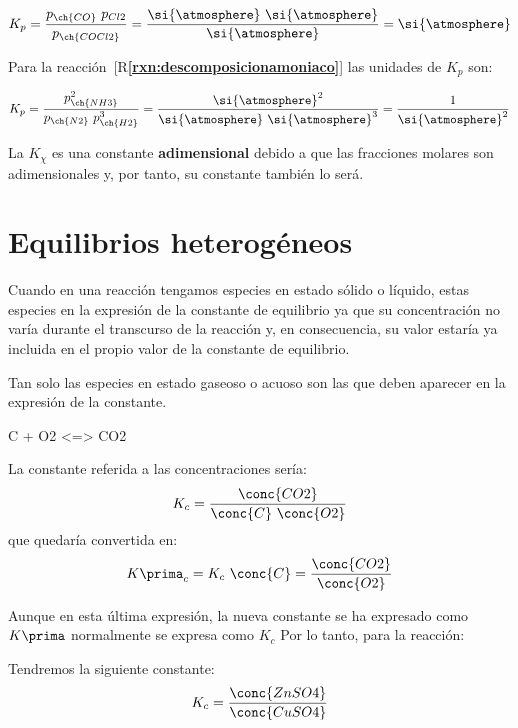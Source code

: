     \begin{equation*}
        K_p = \dfrac{p_{\ch{CO} }\ p_{Cl2}}{p_{\ch{COCl2}}} = \dfrac{\si{\atmosphere}\ \si{\atmosphere}}{\si{\atmosphere}} = \si{\atmosphere}
    \end{equation*}

    Para la reacción~[R\textcolor{blue}{\textbf{\ref{rxn:descomposicionamoniaco}}}] las unidades de \( K_p \) son:

    \begin{equation*}
        K_p = \dfrac{p_{\ch{NH3}}^2}{p_{\ch{N2}}\ p_{\ch{H2}}^3} = \dfrac{\si{\atmosphere}^2}{\si{\atmosphere}\ \si{\atmosphere}^3 } = \dfrac{1}{\si{\atmosphere}^2}
    \end{equation*}

    La \( K_{\chi} \) es una constante \textbf{adimensional} debido a que las fracciones molares son adimensionales y, por tanto, su constante también lo será.


    \section{Equilibrios heterogéneos}\label{sec:equilibrios-heterogeneos}

    \setcounter{ejemplo}{0}
    Cuando en una reacción tengamos especies en estado sólido o líquido, estas especies  en la expresión de la constante de equilibrio ya que su concentración no varía durante el transcurso de la reacción y, en consecuencia, su valor estaría ya incluida en el propio valor de la constante de equilibrio.

    Tan solo las especies en estado gaseoso o acuoso son las que deben aparecer en la expresión de la constante.
    \begin{reaction*}
        C \sld{} + O2 \gas{} <=> CO2 \gas{}
    \end{reaction*}
    La constante referida a las concentraciones sería:
    \begin{equation*}
        K_c = \dfrac{\conc{CO2}}{\conc{C}\ \conc{O2}}
    \end{equation*}
    que quedaría convertida en:
    \begin{equation*}
        K\prima_c = K_c\ \conc{C} = \dfrac{\conc{CO2}}{\conc{O2}}
    \end{equation*}

    Aunque en esta última expresión, la nueva constante se ha expresado como \(K\prima\) normalmente se expresa como \(K_c\)
    Por lo tanto, para la reacción:
    \begin{center}
    \end{center}
    Tendremos la siguiente constante:
    \begin{equation*}
        K_c = \dfrac{\conc{ZnSO4}}{\conc{CuSO4}}
    \end{equation*}


